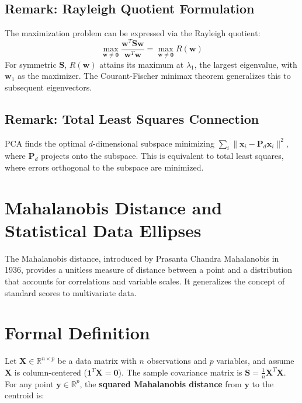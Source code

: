 \documentclass{article}
\begin{document}
\subsection*{Remark: Rayleigh Quotient Formulation}
The maximization problem can be expressed via the Rayleigh quotient:
\begin{equation*}
    \max_{\mathbf{w}\neq\mathbf{0}} \frac{\mathbf{w}^T\mathbf{S}\mathbf{w}}{\mathbf{w}^T\mathbf{w}} = \max_{\mathbf{w}\neq\mathbf{0}} R(\mathbf{w})
\end{equation*}
For symmetric $\mathbf{S}$, $R(\mathbf{w})$ attains its maximum at $\lambda_1$, the largest eigenvalue, with $\mathbf{w}_1$ as the maximizer. The Courant-Fischer minimax theorem generalizes this to subsequent eigenvectors.

\subsection*{Remark: Total Least Squares Connection}
PCA finds the optimal $d$-dimensional subspace minimizing $\sum_i \|\mathbf{x}_i - \mathbf{P}_d\mathbf{x}_i\|^2$, where $\mathbf{P}_d$ projects onto the subspace. This is equivalent to total least squares, where errors orthogonal to the subspace are minimized.










\section*{Mahalanobis Distance and Statistical Data Ellipses}

The Mahalanobis distance, introduced by Prasanta Chandra Mahalanobis in 1936, provides a unitless measure of distance between a point and a distribution that accounts for correlations and variable scales. It generalizes the concept of standard scores to multivariate data.

\section*{Formal Definition}

Let $\mathbf{X} \in \mathbb{R}^{n \times p}$ be a data matrix with $n$ observations and $p$ variables, and assume $\mathbf{X}$ is column-centered ($\mathbf{1}^T\mathbf{X} = \mathbf{0}$). The sample covariance matrix is $\mathbf{S} = \frac{1}{n}\mathbf{X}^T\mathbf{X}$. For any point $\mathbf{y} \in \mathbb{R}^p$, the \textbf{squared Mahalanobis distance} from $\mathbf{y}$ to the centroid is:
\end{document}
